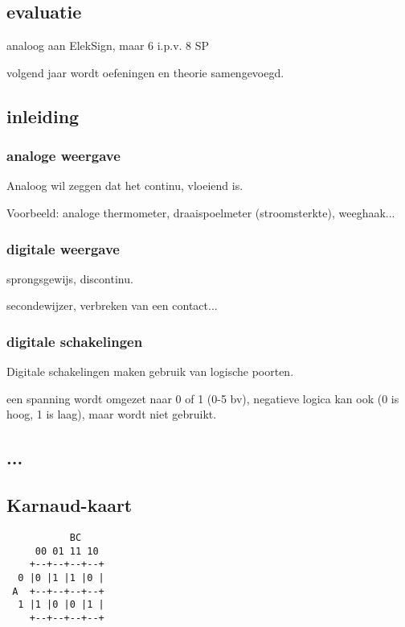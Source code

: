 \documentclass[11pt, a4paper]{article}
\begin{document}
\subsection{evaluatie}

analoog aan ElekSign, maar 6 i.p.v. 8 SP

volgend jaar wordt oefeningen en theorie samengevoegd.

\subsection{inleiding}

\subsubsection{analoge weergave}

Analoog wil zeggen dat het continu, vloeiend is.

Voorbeeld: analoge thermometer, draaispoelmeter (stroomsterkte), weeghaak...

\subsubsection{digitale weergave}

sprongsgewijs, discontinu.

secondewijzer, verbreken van een contact...

\subsubsection{digitale schakelingen}

Digitale schakelingen maken gebruik van logische poorten.

een spanning wordt omgezet naar 0 of 1 (0-5 bv), negatieve logica kan ook (0 is hoog, 1 is laag), maar wordt niet gebruikt.

\subsection{...}

\subsection{Karnaud-kaart}


\begin{verbatim}
    	   BC
     00 01 11 10
    +--+--+--+--+
  0 |0 |1 |1 |0 |
 A  +--+--+--+--+
  1 |1 |0 |0 |1 |
    +--+--+--+--+
\end{verbatim}
\end{document}
